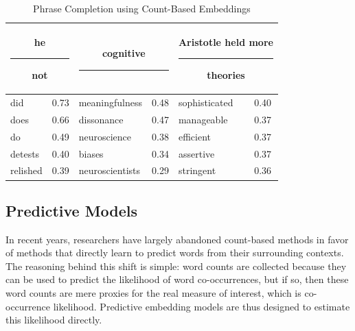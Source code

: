 \begin{table}[!t]
\begin{center} 
\caption{Phrase Completion using Count-Based Embeddings} 

\label{tab:ordermodel} 
\vskip 0.12in

\setlength{\tabcolsep}{13pt}
\begin{tabular}{lllllc} 
\hline

\multicolumn{2}{c}{\rule{0pt}{3ex} he \rule{0.25in}{.3pt} not} & 
\multicolumn{2}{c}{cognitive \rule{0.25in}{.3pt}} & 
\multicolumn{2}{c}{\rule{0pt}{3ex} Aristotle held more \rule{0.25in}{.3pt} theories}  \\
\hline
\rule{0pt}{3ex}did & 0.73 & meaningfulness & 0.48 & \quad \enspace sophisticated & 0.40 \\
does & 0.66 & dissonance & 0.47 & \quad \enspace manageable & 0.37 \\
do & 0.49 & neuroscience & 0.38 & \quad \enspace efficient & 0.37 \\
detests & 0.40 &  biases & 0.34 & \quad \enspace assertive & 0.37 \\
relished & 0.39 & neuroscientists & 0.29 & \quad \enspace stringent & 0.36 \\
\hline
\end{tabular} 
\end{center} 
\end{table}

\subsection{Predictive Models}

In recent years, researchers have largely abandoned count-based methods in favor of methods that directly learn to predict words from their surrounding contexts. The reasoning behind this shift is simple: word counts are collected because they can be used to predict the likelihood of word co-occurrences, but if so, then these word counts are mere proxies for the real measure of interest, which is co-occurrence likelihood. Predictive embedding models are thus designed to estimate this likelihood directly. 

